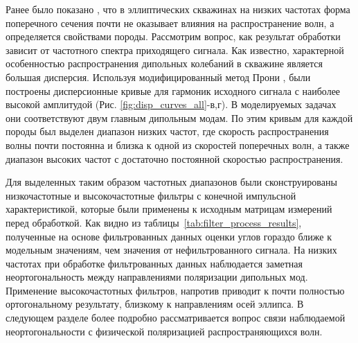 \documentclass[a4paper,11pt]{article}
\begin{document}
Ранее было показано \cite{Seroices2010}, что в эллиптических скважинах на низких частотах форма поперечного сечения почти не оказывает влияния на распространение волн, а определяется свойствами породы. Рассмотрим вопрос, как результат обработки зависит от частотного спектра приходящего сигнала. Как известно, характерной особенностью распространения дипольных колебаний в скважине является большая дисперсия. Используя модифицированный метод Прони \cite{Ekstrom1995}, были построены дисперсионные кривые для гармоник исходного сигнала с наиболее высокой амплитудой (Рис. \ref{fig:disp_curves_all}-в,г). В моделируемых задачах они соответствуют двум главным дипольным модам. %
По этим кривым для каждой породы был выделен диапазон низких частот, где скорость распространения волны почти постоянна и близка к одной из скоростей поперечных волн, а также диапазон высоких частот с достаточно постоянной скоростью распространения. 

Для выделенных таким образом частотных диапазонов были сконструированы низкочастотные и высокочастотные фильтры с конечной импульсной характеристикой, которые были применены к исходным матрицам измерений перед обработкой. Как видно из таблицы~\ref{tab:filter_process_results}, полученные на основе фильтрованных данных оценки углов гораздо ближе к модельным значениям, чем значения от нефильтрованного сигнала. На низких частотах при обработке фильтрованных данных наблюдается заметная неортогональность между направлениями поляризации дипольных мод. Применение высокочастотных фильтров, напротив приводит к почти полностью ортогональному результату, близкому к направлениям осей эллипса. В следующем разделе более подробно рассматривается вопрос связи наблюдаемой неортогональности с физической поляризацией распространяющихся волн.
\end{document}
